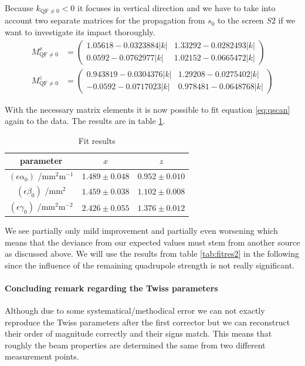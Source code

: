 \documentclass[11pt,a4paper,notitlepage]{scrartcl}
\begin{document}
Because $k_{\text{QF}\neq0}<0$ it focuses in vertical direction and we have to take into account two separate matrices for the propagation from $s_0$ to the screen $S2$ if we want to investigate its impact thoroughly.
\begin{align*}
	M_{\text{QF}\neq0}^x&=\begin{pmatrix}
		1.05618 - 0.0323884|k| & 1.33292 - 0.0282493|k|\\
		0.0592 - 0.0762977|k| & 1.02152 - 0.0665472|k|
	\end{pmatrix} \\ M_{\text{QF}\neq0}^z&=\begin{pmatrix}
	0.943819 - 0.0304376|k| & 1.29208 - 0.0275402|k|\\
	-0.0592 - 0.0717023|k| &0.978481 - 0.0648768|k| 
\end{pmatrix}
\end{align*}  

With the necessary matrix elements it is now possible to fit equation \eqref{eq:qscan} again to the data. The results are in table \ref{tab:fitres3}. 

\begin{table}[htbp]
	\centering
	\begin{tabular}{c||cc}
		parameter& $x$& $z$\\
		\hline
		\hline
		
		$(\epsilon\alpha_0)$ /$\si{\milli\m^2\m^{-1}}$ &$1.489\pm0.048$ & $0.952\pm0.010$\\
		$(\epsilon\beta_0)$ /$\si{\milli\m^2}$ &$1.459\pm0.038$ & $1.102\pm0.008$\\
		$(\epsilon\gamma_0)$ /$\si{\milli\m^2\m^{-2}}$ &$2.426\pm0.055$ &$1.376\pm0.012$\\
		
		
	\end{tabular}
	\caption{Fit results}
	\label{tab:fitres3}
\end{table}

We see partially only mild improvement and partially even worsening which means that the deviance from our expected values must stem from another source as discussed above. We will use the results from table \ref{tab:fitres2} in the following since the influence of the remaining quadrupole strength is not really significant.
\paragraph{Concluding remark regarding the Twiss parameters}
Although due to some systematical/methodical error we can not exactly reproduce the Twiss parameters after the first corrector but we can reconstruct their order of magnitude correctly and their signs match. This means that roughly the beam properties are determined the same from two different measurement points.
\end{document}
